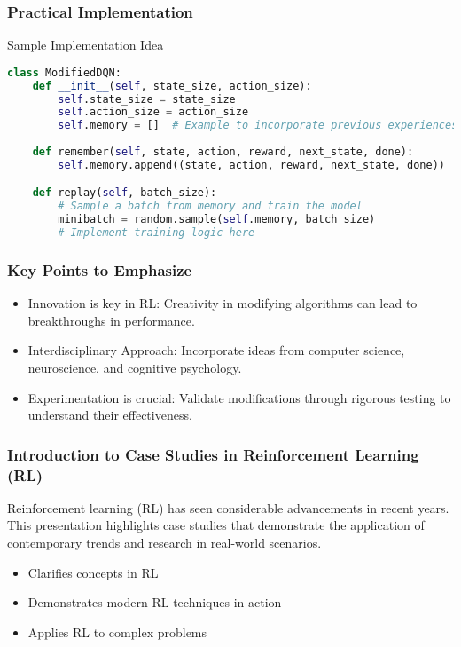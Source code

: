 \documentclass{beamer}
\begin{document}
\begin{frame}[fragile]
    \frametitle{Practical Implementation}
    \begin{block}{Sample Implementation Idea}
        \begin{lstlisting}[language=Python]
class ModifiedDQN:
    def __init__(self, state_size, action_size):
        self.state_size = state_size
        self.action_size = action_size
        self.memory = []  # Example to incorporate previous experiences
        
    def remember(self, state, action, reward, next_state, done):
        self.memory.append((state, action, reward, next_state, done))

    def replay(self, batch_size):
        # Sample a batch from memory and train the model
        minibatch = random.sample(self.memory, batch_size)
        # Implement training logic here
        \end{lstlisting}
    \end{block}
\end{frame}

\begin{frame}
    \frametitle{Key Points to Emphasize}
    \begin{itemize}
        \item Innovation is key in RL: Creativity in modifying algorithms can lead to breakthroughs in performance.
        \item Interdisciplinary Approach: Incorporate ideas from computer science, neuroscience, and cognitive psychology.
        \item Experimentation is crucial: Validate modifications through rigorous testing to understand their effectiveness.
    \end{itemize}
\end{frame}

\begin{frame}[fragile]
    \frametitle{Introduction to Case Studies in Reinforcement Learning (RL)}
    Reinforcement learning (RL) has seen considerable advancements in recent years. This presentation highlights case studies that demonstrate the application of contemporary trends and research in real-world scenarios. 
    \begin{itemize}
        \item Clarifies concepts in RL
        \item Demonstrates modern RL techniques in action
        \item Applies RL to complex problems
    \end{itemize}
\end{frame}
\end{document}
